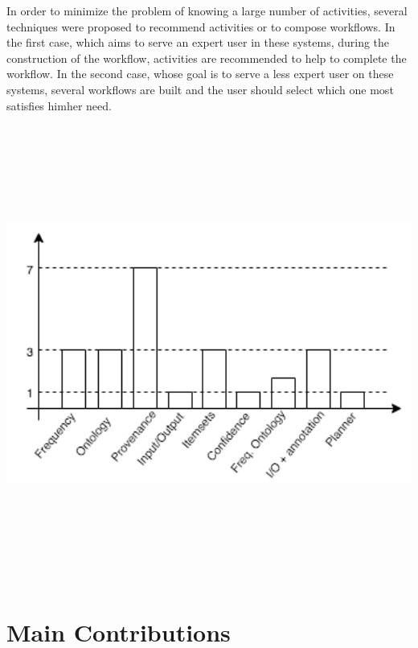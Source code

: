 \documentclass[ a0, portrait]{a0poster}
\begin{document}
\begin{multicols}{2}
In order to minimize the problem of knowing a large number of activities, several techniques were proposed to recommend activities or to compose workflows. In the first case, which aims to serve an expert user in these systems, during the construction of the workflow, activities are recommended to help to complete the workflow. In the second case, whose goal is to serve a less expert user on these systems, several workflows are built and the user should select which one most satisfies him\/her need.
\begin{center}
\includegraphics[height=15cm, width=28cm]{GraficoQuantidadeTecnica.png}
\end{center}

\color{DarkSlateGray} %

\section*{Main Contributions}


\end{multicols}
\end{document}
